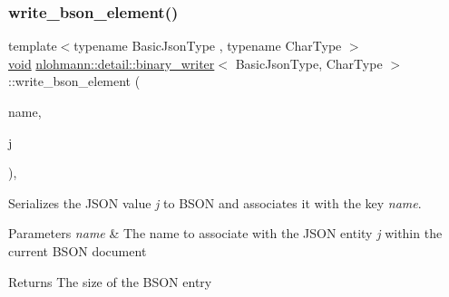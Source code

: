 \subsubsection{\texorpdfstring{write\_bson\_element()}{write\_bson\_element()}}
{\footnotesize\ttfamily template$<$typename Basic\+Json\+Type , typename Char\+Type $>$ \\
\mbox{\hyperlink{namespacenlohmann_1_1detail_a59fca69799f6b9e366710cb9043aa77d}{void}} \mbox{\hyperlink{classnlohmann_1_1detail_1_1binary__writer}{nlohmann\+::detail\+::binary\+\_\+writer}}$<$ Basic\+Json\+Type, Char\+Type $>$\+::write\+\_\+bson\+\_\+element (\begin{DoxyParamCaption}\item[{const \mbox{\hyperlink{classnlohmann_1_1detail_1_1binary__writer_a29f2ae7a5c4a8c1dae47b3b2310de8a8}{string\+\_\+t}} \&}]{name,  }\item[{const Basic\+Json\+Type \&}]{j }\end{DoxyParamCaption})\hspace{0.3cm}{\ttfamily [inline]}, {\ttfamily [private]}}



Serializes the J\+S\+ON value {\itshape j} to B\+S\+ON and associates it with the key {\itshape name}. 


\begin{DoxyParams}{Parameters}
{\em name} & The name to associate with the J\+S\+ON entity {\itshape j} within the current B\+S\+ON document \\
\hline
\end{DoxyParams}
\begin{DoxyReturn}{Returns}
The size of the B\+S\+ON entry 
\end{DoxyReturn}
\mbox{\label{classnlohmann_1_1detail_1_1binary__writer_a1b5b7f5c03b1f8b1f59ea61db9634108}} 
